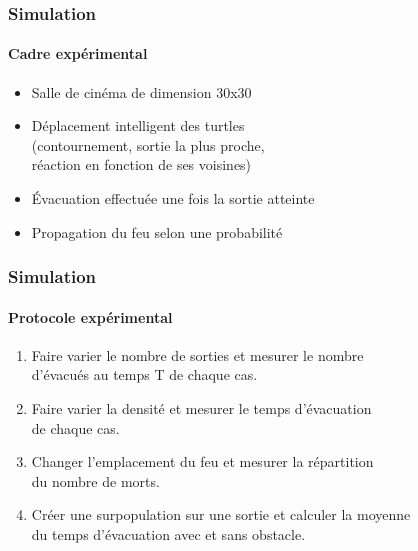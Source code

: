 \documentclass[10pt]{beamer}
\begin{document}
\begin{frame}
	\frametitle{\textbf {\Large Simulation}}
	\framesubtitle{\large Cadre expérimental}
	\begin{itemize}
		\item Salle de cinéma de dimension 30x30
		\medskip 
		\item Déplacement intelligent des turtles\\
		\medskip
		\small (contournement, sortie la plus proche,\\réaction en fonction de ses voisines)
		\medskip
		\item Évacuation effectuée une fois la sortie atteinte
		\medskip
		\item Propagation du feu selon une probabilité
	\end{itemize}
\end{frame}

\begin{frame}
	\frametitle{\textbf {\Large Simulation}}
	\framesubtitle{\large Protocole expérimental}
	\begin{enumerate}

		\item Faire varier le nombre de sorties et mesurer le nombre \\d'évacués au temps T de chaque cas. 
		\medskip 
		\item Faire varier la densité et mesurer le temps d'évacuation \\de chaque cas. 
		\medskip 
		\item Changer l'emplacement du feu et mesurer la répartition \\du nombre de morts. 
		\medskip 
		\item Créer une surpopulation sur une sortie et calculer la moyenne \\du temps d'évacuation avec et sans obstacle.
		\medskip 
	\end{enumerate}

\end{frame}
\end{document}

